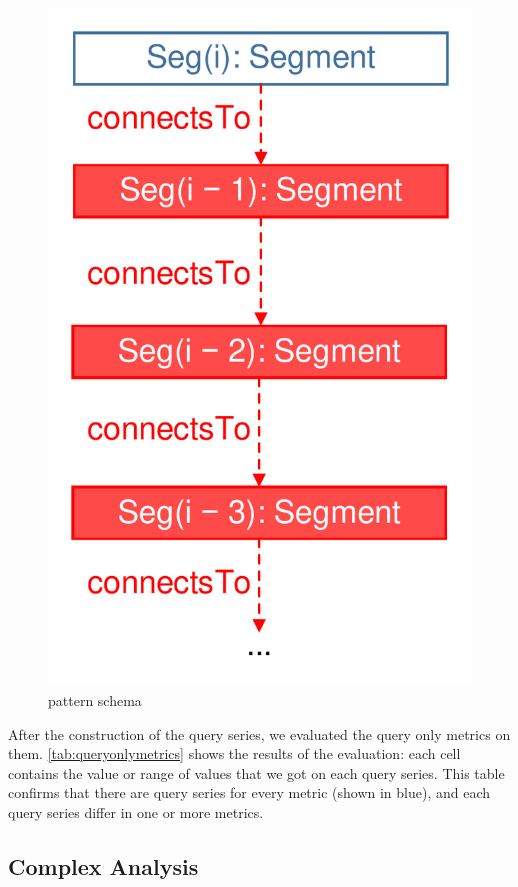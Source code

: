 \begin{figure}[h!]
\begin{center}
    \includegraphics[scale=0.4]{figures/negs.pdf}
    \caption{ pattern schema}
    \label{fig:asenegs}
\end{center}
\end{figure}



After the construction of the query series, we evaluated the query only metrics
on them. \autoref{tab:queryonlymetrics} shows the results of the evaluation:
each cell contains the value or range of values that we got on each query
series. This table confirms that there are query series for every metric (shown
in blue), and each query series differ in one or more metrics.

\subsection{Complex Analysis}
